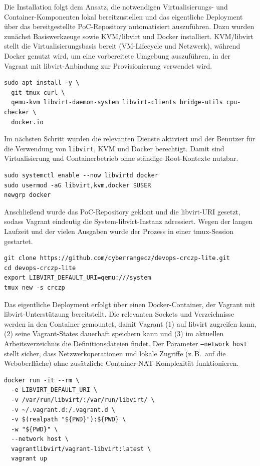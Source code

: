 Die Installation folgt dem Ansatz, die notwendigen Virtualisierungs- und Container-Komponenten lokal
bereitzustellen und das eigentliche Deployment über das bereitgestellte PoC-Repository automatisiert
auszuführen. Dazu wurden zunächst Basiswerkzeuge sowie KVM/libvirt und Docker installiert.
KVM/libvirt stellt die Virtualisierungsbasis bereit (VM-Lifecycle und Netzwerk), während Docker
genutzt wird, um eine vorbereitete Umgebung auszuführen, in der Vagrant mit libvirt-Anbindung zur
Provisionierung verwendet wird.

\begin{verbatim}
sudo apt install -y \
  git tmux curl \
  qemu-kvm libvirt-daemon-system libvirt-clients bridge-utils cpu-checker \
  docker.io
\end{verbatim}

Im nächsten Schritt wurden die relevanten Dienste aktiviert und der Benutzer für die Verwendung von
\texttt{libvirt}, KVM und Docker berechtigt. Damit sind Virtualisierung und Containerbetrieb ohne
ständige Root-Kontexte nutzbar.

\begin{verbatim}
sudo systemctl enable --now libvirtd docker
sudo usermod -aG libvirt,kvm,docker $USER
newgrp docker
\end{verbatim}

Anschließend wurde das PoC-Repository geklont und die libvirt-URI gesetzt, sodass Vagrant eindeutig
die System-libvirt-Instanz adressiert. Wegen der langen Laufzeit und der vielen Ausgaben wurde der
Prozess in einer tmux-Session gestartet.

\begin{verbatim}
git clone https://github.com/cyberrangecz/devops-crczp-lite.git
cd devops-crczp-lite
export LIBVIRT_DEFAULT_URI=qemu:///system
tmux new -s crczp
\end{verbatim}

Das eigentliche Deployment erfolgt über einen Docker-Container, der Vagrant mit libvirt-Unterstützung
bereitstellt. Die relevanten Sockets und Verzeichnisse werden in den Container gemountet, damit
Vagrant (1) auf libvirt zugreifen kann, (2) seine Vagrant-States dauerhaft speichern kann und (3) im
aktuellen Arbeitsverzeichnis die Definitionsdateien findet. Der Parameter \texttt{--network host}
stellt sicher, dass Netzwerkoperationen und lokale Zugriffe (z.\,B.\ auf die Weboberfläche) ohne
zusätzliche Container-NAT-Komplexität funktionieren.

\begin{verbatim}
docker run -it --rm \
  -e LIBVIRT_DEFAULT_URI \
  -v /var/run/libvirt/:/var/run/libvirt/ \
  -v ~/.vagrant.d:/.vagrant.d \
  -v $(realpath "${PWD}"):${PWD} \
  -w "${PWD}" \
  --network host \
  vagrantlibvirt/vagrant-libvirt:latest \
  vagrant up
\end{verbatim}


